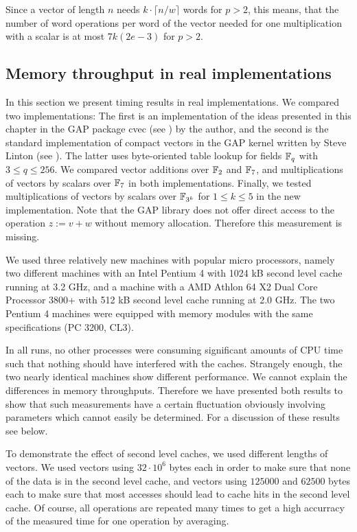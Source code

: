 \begin{Rem}
Since a vector of length $n$ needs $k \cdot \lceil n/w \rceil$ words
for $p > 2$, this means, that the number of word operations per word of
the vector needed for one multiplication with a scalar is at most 
$7k(2e-3)$ for $p > 2$.
\end{Rem}

\subsection{Memory throughput in real implementations}

In this section we present timing results in real implementations. We 
compared two implementations: The first is an implementation of the
ideas presented in this chapter in the {\sf GAP} package {\sf cvec}
(see \cite{cvec}) by the author, and the second is the standard implementation
of compact vectors in the {\sf GAP} kernel written by Steve Linton
(see \cite{GAP4}).
The latter uses byte-oriented table lookup for fields $\mathbb{F}_q$ with 
$3 \le q \le 256$. We compared vector additions over $\mathbb{F}_2$ and $\mathbb{F}_7$, 
and multiplications of vectors by scalars over $\mathbb{F}_7$ in both implementations.
Finally, we tested multiplications of vectors by scalars over $\mathbb{F}_{3^k}$
for $1 \le k \le 5$ in the new implementation.
Note that the {\sf GAP} library does not offer direct access to the
operation $z := v+w$ without memory allocation. Therefore this 
measurement is missing.

We used three relatively new machines with popular micro processors, 
namely two different machines
with an Intel Pentium 4 with 1024 kB second level cache running at 3.2 GHz, 
and a machine with a AMD Athlon 64 X2 Dual Core Processor 3800+ with 512 kB
second level cache running at 2.0 GHz. The two Pentium 4 machines were
equipped with memory modules with the same specifications (PC 3200, CL3). 

In all runs, no other processes
were consuming significant amounts of CPU time such that nothing should
have interfered with the caches. Strangely enough, the two nearly identical
machines show different performance. 
We cannot explain the differences in memory throughputs.
Therefore we have presented both
results to show that such measurements have a certain fluctuation
obviously involving parameters which cannot easily be determined.
For a discussion of these results see below.

To demonstrate the effect of second level caches, we used different 
lengths of vectors. We used vectors using $32 \cdot 10^6$ bytes each in
order to make sure that none of the data is in the second level cache,
and vectors using $125000$ and $62500$ bytes each to make sure that
most accesses should lead to cache hits in the second level cache.
Of course, all operations are repeated many times to get a high accurracy
of the measured time for one operation by averaging.

